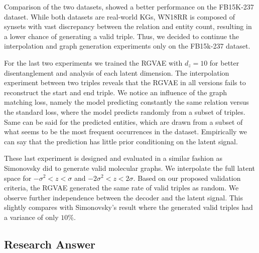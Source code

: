 Comparison of the two datasets, showed a better performance on the FB15K-237 dataset. While both datasets are real-world KGs, WN18RR is composed of synsets with vast discrepancy between the relation and entity count, resulting in a lower chance of generating a valid triple. Thus, we decided to continue the interpolation and graph generation experiments only on the FB15k-237 dataset. 

For the last two experiments we trained the RGVAE with $d_z=10$ for better disentanglement and analysis of each latent dimension.
The interpolation experiment between two triples reveals that the RGVAE in all versions fails to reconstruct the start and end triple. We notice an influence of the graph matching loss, namely the model predicting constantly the same relation versus the standard loss, where the model predicts randomly from a subset of triples. Same can be said for the predicted entities, which are drawn from a subset of what seems to be the most frequent occurrences in the dataset. Empirically we can say that the prediction has little prior conditioning on the latent signal.

These last experiment is designed and evaluated in a similar fashion as Simonovsky did to generate valid molecular graphs. We interpolate the full latent space for $-\sigma^2 < z < \sigma$ and $-2\sigma^2 < z < 2\sigma$. Based on our proposed validation criteria, the RGVAE generated the same rate of valid triples as random. We observe further independence between the decoder and the latent signal. This slightly compares with Simonovsky's result where the generated valid triples had a variance of only $10$\%.





\subsection{Research Answer}



